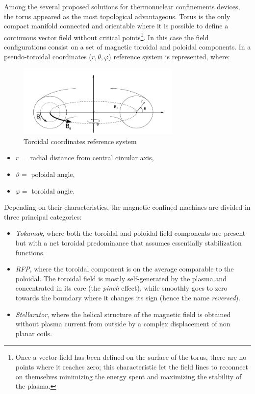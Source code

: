 Among the several proposed solutions for thermonuclear confinements devices, the torus appeared as the most topological advantageous. Torus is the only compact manifold connected and orientable where it is possible to define a continuous vector field without critical points\footnote{Once a vector field has been defined on the surface of the torus, there are no points where it reaches zero; this characteristic let the field lines to reconnect on themselves minimizing the energy spent and maximizing the stability of the plasma.}.
In this case the field configurations consist on a set of magnetic toroidal and poloidal components. In \Figure{\ref{fig:intro_toroidal_coords}} a pseudo-toroidal coordinates ($r,\theta,\varphi$) reference system is represented, where:
\begin{figure}[h!]
    \centering
    \includegraphics[width=8cm]{img/1_intro/toroidal_coords.png}
    \caption{Toroidal coordinates reference system}
    \label{fig:intro_toroidal_coords}
\end{figure}
\begin{itemize}
    \item $r = $ radial distance from central circular axis,
    \item $\vartheta = $ poloidal angle,
    \item $\varphi = $ toroidal angle.
\end{itemize}
Depending on their characteristics, the magnetic confined machines are divided in three principal categories:
\begin{itemize}
    \item \textit{Tokamak}, where both the toroidal and poloidal field components are present but with a net toroidal predominance that assumes essentially stabilization functions.
    \item \textit{RFP}, where the toroidal component is on the average comparable to the poloidal. The toroidal field is mostly self-generated by the plasma and concentrated in its core (the \emph{pinch} effect), while smoothly goes to zero towards the boundary where it changes its sign (hence the name \textit{reversed}). %
    \item \textit{Stellarator}, where the helical structure of the magnetic field is obtained without plasma current from outside by a complex displacement of non planar coils.
\end{itemize}

